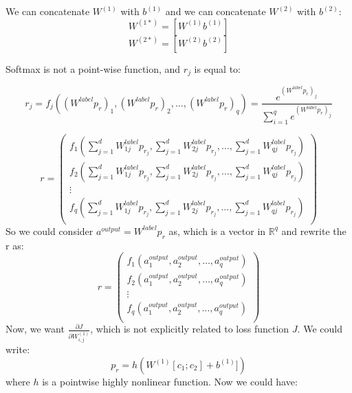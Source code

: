 \documentclass[twoside,12pt]{article}
\begin{document}
We can concatenate $W^{(1)}$ with $b^{(1)}$ and we can concatenate $W^{(2)}$ with $b^{(2)}$:
\begin{equation}
W^{(1*)}=[W^{(1)} b^{(1)}]
\end{equation}
\begin{equation}
W^{(2*)}=[W^{(2)} b^{(2)}]
\end{equation}

Softmax is not a point-wise function, and $r_j$ is equal to:

\begin{equation}
r_j=f_j((W^{label}p_r)_1,(W^{label}p_r)_2,\ldots,(W^{label}p_r)_q)=\frac{e^{(W^{label}p_r)_j}}{\sum_{i=1}^{q}e^{(W^{label}p_r)_j}}
\end{equation}

\begin{equation}
r =
\begin{pmatrix}
  f_1(\sum_{j=1}^{d}W^{label}_{1j} p_{r_j}, \sum_{j=1}^{d}W^{label}_{2j}p_{r_j},\ldots, \sum_{j=1}^{d}W^{label}_{qj}p_{r_j})\\
   f_2(\sum_{j=1}^{d}W^{label}_{1j}p_{r_j}, \sum_{j=1}^{d}W^{label}_{2j}p_{r_j},\ldots, \sum_{j=1}^{d}W^{label}_{qj}p_{r_j}) \\
  \vdots  \\
    f_q(\sum_{j=1}^{d}W^{label}_{1j}p_{r_j}, \sum_{j=1}^{d}W^{label}_{2j}p_{r_j},\ldots, \sum_{j=1}^{d}W^{label}_{qj}p_{r_j})\\
 \end{pmatrix}
\end{equation}
 So we could consider $a^{output}=W^{label}p_r$ as, which is a vector in $\mathbb{R}^q$ and rewrite the r as:
 \begin{equation}
 r=
 \begin{pmatrix}
 f_1(a^{output}_1,a^{output}_2,\ldots,a^{output}_q)\\
  f_2(a^{output}_1,a^{output}_2,\ldots,a^{output}_q)\\
\vdots \\
 f_q(a^{output}_1,a^{output}_2,\ldots,a^{output}_q)\\
 \end{pmatrix}
\end{equation}
Now, we want $\frac{\partial J}{\partial W^{(1)}_{i,j}}$, which is not explicitly related to loss function $J$. We could write:
\begin{equation}
p_r=h(W^{(1)}[c_1;c_2]+b^{(1)}])
\end{equation} 
where $h$ is a pointwise highly nonlinear function. Now we could have:
\end{document}
